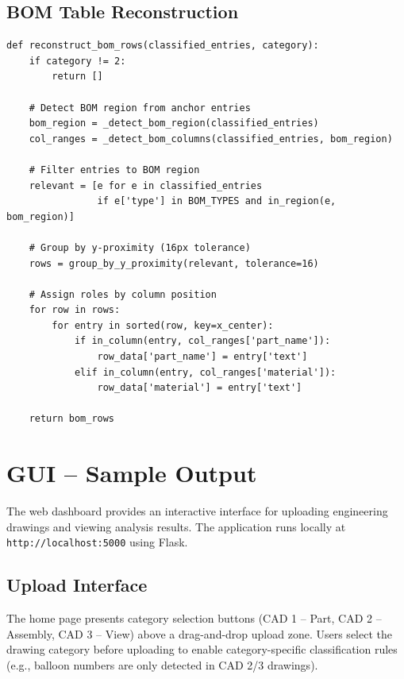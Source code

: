 \documentclass[12pt,a4paper]{article}
\begin{document}
\subsection{BOM Table Reconstruction}

\begin{lstlisting}[caption={Spatial clustering for BOM row reconstruction}]
def reconstruct_bom_rows(classified_entries, category):
    if category != 2:
        return []
    
    # Detect BOM region from anchor entries
    bom_region = _detect_bom_region(classified_entries)
    col_ranges = _detect_bom_columns(classified_entries, bom_region)
    
    # Filter entries to BOM region
    relevant = [e for e in classified_entries 
                if e['type'] in BOM_TYPES and in_region(e, bom_region)]
    
    # Group by y-proximity (16px tolerance)
    rows = group_by_y_proximity(relevant, tolerance=16)
    
    # Assign roles by column position
    for row in rows:
        for entry in sorted(row, key=x_center):
            if in_column(entry, col_ranges['part_name']):
                row_data['part_name'] = entry['text']
            elif in_column(entry, col_ranges['material']):
                row_data['material'] = entry['text']
    
    return bom_rows
\end{lstlisting}


\section{GUI -- Sample Output}

The web dashboard provides an interactive interface for uploading engineering drawings and viewing analysis results. The application runs locally at \texttt{http://localhost:5000} using Flask.

\subsection{Upload Interface}

The home page presents category selection buttons (CAD 1 -- Part, CAD 2 -- Assembly, CAD 3 -- View) above a drag-and-drop upload zone. Users select the drawing category before uploading to enable category-specific classification rules (e.g., balloon numbers are only detected in CAD 2/3 drawings).
\end{document}
